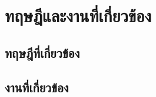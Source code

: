 \chapter{ทฤษฎีและงานที่เกี่ยวข้อง}
\section{ทฤษฎีที่เกี่ยวข้อง}
\subsection{\BlankField[5cm]}
\BlankBody
\subsubsection{\BlankField[5cm]}
\BlankBody
\section{งานที่เกี่ยวข้อง}
\BlankBody
